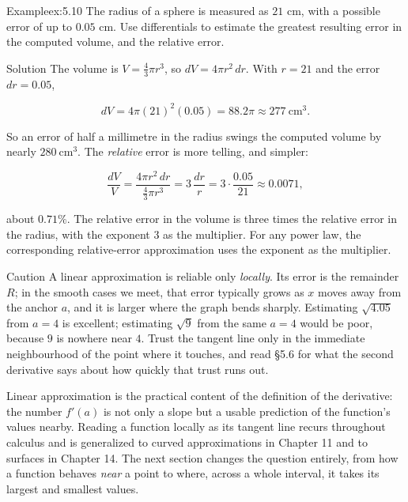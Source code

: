 \documentclass[a4paper,12pt,oneside]{memoir}
\begin{document}
\begin{workedexample}
\begin{envexample}{Example}{ex:5.10}{}
The radius of a sphere is measured as \(21\) cm, with a possible error of up to \(0.05\) cm. Use differentials to estimate the greatest resulting error in the computed volume, and the relative error.
\end{envexample}
\begin{envsolution}{Solution}{}{}
The volume is \(V = \tfrac{4}{3}\pi r^{3}\), so \(dV = 4\pi r^{2}\,dr\). With \(r = 21\) and the error \(dr = 0.05\),

\[ dV = 4\pi (21)^{2}(0.05) = 88.2\pi \approx 277 \ \text{cm}^{3}. \]

So an error of half a millimetre in the radius swings the computed volume by nearly \(280\ \text{cm}^{3}\). The \emph{relative} error is more telling, and simpler:

\[ \frac{dV}{V} = \frac{4\pi r^{2}\,dr}{\tfrac{4}{3}\pi r^{3}} = 3\,\frac{dr}{r} = 3\cdot\frac{0.05}{21} \approx 0.0071, \]

about \(0.71\%\). The relative error in the volume is three times the relative error in the radius, with the exponent \(3\) as the multiplier. For any power law, the corresponding relative-error approximation uses the exponent as the multiplier. \qedmark
\end{envsolution}
\end{workedexample}
\begin{envcaution}{Caution}{}{}
A linear approximation is reliable only \emph{locally}. Its error is the remainder \(R\); in the smooth cases we meet, that error typically grows as \(x\) moves away from the anchor \(a\), and it is larger where the graph bends sharply. Estimating \(\sqrt{4.05}\) from \(a = 4\) is excellent; estimating \(\sqrt{9}\) from the same \(a = 4\) would be poor, because \(9\) is nowhere near \(4\). Trust the tangent line only in the immediate neighbourhood of the point where it touches, and read §5.6 for what the second derivative says about how quickly that trust runs out.
\end{envcaution}
Linear approximation is the practical content of the definition of the derivative: the number \(f'(a)\) is not only a slope but a usable prediction of the function’s values nearby. Reading a function locally as its tangent line recurs throughout calculus and is generalized to curved approximations in Chapter 11 and to surfaces in Chapter 14. The next section changes the question entirely, from how a function behaves \emph{near} a point to where, across a whole interval, it takes its largest and smallest values.
\end{document}
